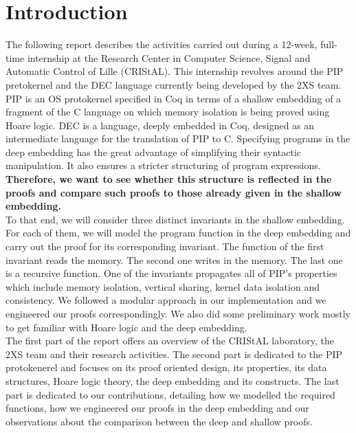 \chapter{Introduction}
The following report describes the activities carried out during a 12-week, full-time internship at the Research Center in Computer Science, Signal and Automatic Control of Lille (CRIStAL)\cite{cristal}. This internship revolves around the PIP pretokernel and the DEC language currently being developed by the 2XS team. PIP\cite{PIP} is an OS protokernel specified in Coq in terms of a shallow embedding of a fragment of the C language on which memory isolation is being proved using Hoare logic. DEC\cite{DEC} is a language, deeply embedded in Coq, designed as an intermediate language for the translation of PIP to C. Specifying programs in the deep embedding has the great advantage of simplifying their syntactic manipulation. It also ensures a stricter structuring of program expressions. \textbf{Therefore, we want to see whether this structure is reflected in the proofs and compare such proofs to those already given in the shallow embedding.}\\ 

To that end, we will consider three distinct invariants in the shallow embedding. For each of them, we will model the program function in the deep embedding and carry out the proof for its corresponding invariant. The function of the first invariant reads the memory. The second one writes in the memory. The last one is a recursive function. One of the invariants propagates all of PIP's properties which include memory isolation, vertical sharing, kernel data isolation and consistency. We followed a modular approach in our implementation and we engineered our proofs correspondingly. We also did some preliminary work mostly to get familiar with Hoare logic and the deep embedding. \\

The first part of the report offers an overview of the CRIStAL laboratory, the 2XS team and their research activities. The second part is dedicated to the PIP protokenerel and focuses on its proof oriented design, its properties, its data structures, Hoare logic theory, the deep embedding and its constructs. The last part is dedicated to our contributions, detailing how we modelled the required functions, how we engineered our proofs in the deep embedding and our observations about the comparison between the deep and shallow proofs.
  



